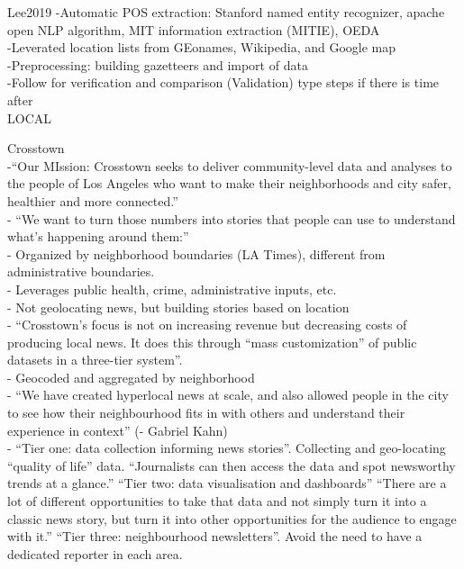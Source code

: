 {Lee2019}
-{\color{orange}Automatic POS extraction: Stanford named entity recognizer, apache open NLP algorithm, MIT information extraction (MITIE), OEDA\cite{Lee2019}}\\
-Leverated location lists from GEonames, Wikipedia, and Google map\\
-Preprocessing: building gazetteers and import of data\\
-Follow for verification and comparison (Validation) type steps if there is time after\\

LOCAL

Crosstown\\
-{\color{orange}“Our MIssion: Crosstown seeks to deliver community-level data and analyses to the people of Los Angeles who want to make their neighborhoods and city safer, healthier and more connected.”\cite{crosstown2020}}\\
-{\color{orange} “We want to turn those numbers into stories that people can use to understand what’s happening around them:” \cite{crosstown2020}}\\
-{\color{orange} Organized by neighborhood boundaries (LA Times), different from administrative boundaries.\cite{crosstown2020}}\\
-{\color{orange} Leverages public health, crime, administrative inputs, etc.\cite{crosstown2020}}\\
-{\color{orange} Not geolocating news, but building stories based on location \cite{crosstown2020}}\\
-{\color{orange} “Crosstown’s focus is not on increasing revenue but decreasing costs of producing local news. It does this through “mass customization” of public datasets in a three-tier system”. \cite{Granger2020}}\\
-{\color{orange} Geocoded and aggregated by neighborhood\cite{Granger2020}}\\
-{\color{orange} “We have created hyperlocal news at scale, and also allowed people in the city to see how their neighbourhood fits in with others and understand their experience in context” (- Gabriel Kahn)\cite{Granger2020}}\\
-{\color{orange} “Tier one: data collection informing news stories”. Collecting and geo-locating “quality of life” data. “Journalists can then access the data and spot newsworthy trends at a glance.'' ``Tier two: data visualisation and dashboards” “There are a lot of different opportunities to take that data and not simply turn it into a classic news story, but turn it into other opportunities for the audience to engage with it.” “Tier three: neighbourhood newsletters”. Avoid the need to have a dedicated reporter in each area.\cite{Granger2020}}\\

